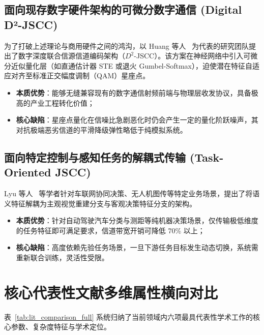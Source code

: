\subsection{面向现存数字硬件架构的可微分数字通信 (Digital D²-JSCC)}
为了打破上述理论与商用硬件之间的鸿沟，以 Huang 等人~\cite{huang2025d2} 为代表的研究团队提出了数字深度联合信源信道编码架构（$D^2$-JSCC）。该方案在神经网络中引入可微分近似量化层（如直通估计器 STE 或退火 Gumbel-Softmax），迫使潜在特征自适应对齐至标准正交幅度调制（QAM）星座点。
\begin{itemize}
  \item \textbf{本质优势}：能够无缝兼容现有的数字通信射频前端与物理层收发协议，具备极高的产业工程转化价值；
  \item \textbf{核心缺陷}：星座点量化在信噪比急剧恶化时仍会产生一定的量化阶跃噪声，其对抗极端恶劣信道的平滑降级弹性略低于纯模拟系统。
\end{itemize}

\subsection{面向特定控制与感知任务的解耦式传输 (Task-Oriented JSCC)}
Lyu 等人~\cite{lyu2024semantic} 等学者针对车联网协同决策、无人机图传等特定业务场景，提出了将语义特征解耦为主观视觉重建分支与客观决策特征分支的架构。
\begin{itemize}
  \item \textbf{本质优势}：针对自动驾驶汽车分类与测距等纯机器决策场景，仅传输极低维度的任务特征即可满足要求，信道带宽开销可降低 70\% 以上；
  \item \textbf{核心缺陷}：高度依赖先验任务场景，一旦下游任务目标发生动态切换，系统需重新联合训练，灵活性受限。
\end{itemize}

\section{核心代表性文献多维属性横向对比}
表~\ref{tab:lit_comparison_full} 系统归纳了当前领域内六项最具代表性学术工作的核心参数、复杂度特征与学术定位。

